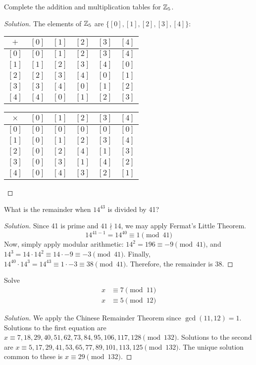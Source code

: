 \documentclass{agony}
\begin{document}
\question Complete the addition and multiplication tables for $\mathbb{Z}_5$.
\begin{proof}[Solution]
  The elements of $\mathbb{Z}_5$ are $\{[0], [1], [2], [3], [4]\}$:
  \begin{center}
    \begin{tabular}{c|c|c|c|c|c}
      $+$   & $[0]$ & $[1]$ & $[2]$ & $[3]$ & $[4]$ \\ \hline
      $[0]$ & $[0]$ & $[1]$ & $[2]$ & $[3]$ & $[4]$ \\
      $[1]$ & $[1]$ & $[2]$ & $[3]$ & $[4]$ & $[0]$ \\
      $[2]$ & $[2]$ & $[3]$ & $[4]$ & $[0]$ & $[1]$ \\
      $[3]$ & $[3]$ & $[4]$ & $[0]$ & $[1]$ & $[2]$ \\
      $[4]$ & $[4]$ & $[0]$ & $[1]$ & $[2]$ & $[3]$ \\
    \end{tabular}
    \quad
    \begin{tabular}{c|c|c|c|c|c}
      $\times$ & $[0]$ & $[1]$ & $[2]$ & $[3]$ & $[4]$ \\ \hline
      $[0]$    & $[0]$ & $[0]$ & $[0]$ & $[0]$ & $[0]$ \\
      $[1]$    & $[0]$ & $[1]$ & $[2]$ & $[3]$ & $[4]$ \\
      $[2]$    & $[0]$ & $[2]$ & $[4]$ & $[1]$ & $[3]$ \\
      $[3]$    & $[0]$ & $[3]$ & $[1]$ & $[4]$ & $[2]$ \\
      $[4]$    & $[0]$ & $[4]$ & $[3]$ & $[2]$ & $[1]$ \\
    \end{tabular}
  \end{center}
\end{proof}


\question What is the remainder when $14^{43}$ is divided by 41?
\begin{proof}[Solution]
  Since 41 is prime and $41 \nmid 14$, we may apply Fermat's Little Theorem.
  \begin{equation*}
    14^{41-1} = 14^{40} \equiv 1 \pmod{41}
  \end{equation*}
  Now, simply apply modular arithmetic: $14^2 = 196 \equiv -9 \pmod{41}$,
  and $14^3 = 14 \cdot 14^2 \equiv 14 \cdot -9 \equiv -3 \pmod{41}$.
  Finally, $14^{40} \cdot 14^3 = 14^{43} \equiv 1 \cdot -3 \equiv 38 \pmod{41}$.
  Therefore, the remainder is 38.
\end{proof}


\question Solve \begin{align*}
  x & \equiv 7 \pmod{11} \\
  x & \equiv 5 \pmod{12}
\end{align*}
\begin{proof}[Solution]
  We apply the Chinese Remainder Theorem since $\gcd(11,12)=1$.
  Solutions to the first equation are $x \equiv 7,18,29,40,51,62,73,84,95,106,117,128 \pmod{132}$.
  Solutions to the second are $x \equiv 5,17,29,41,53,65,77,89,101,113,125 \pmod{132}$.
  The unique solution common to these is $x \equiv 29 \pmod{132}$.
\end{proof}
\end{document}
